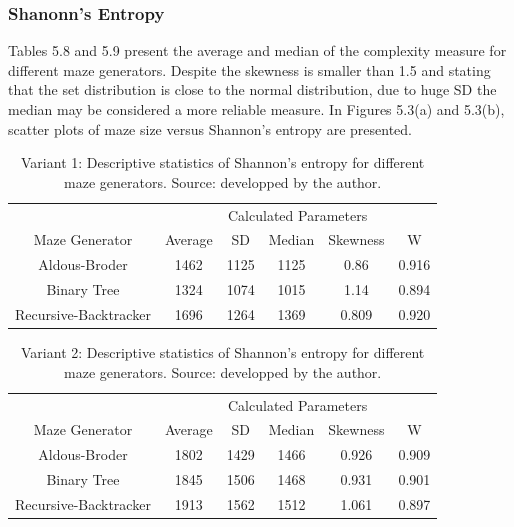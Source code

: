  \subsubsection{Shanonn's Entropy}
Tables 5.8 and 5.9 present the average and median of the complexity measure for different maze generators. Despite the skewness is smaller than 1.5 and stating that the set
distribution is close to the normal distribution, due to huge SD the median may be considered a more reliable measure. In Figures 5.3(a) and 5.3(b), scatter
plots of maze size versus Shannon's entropy are presented.\\

\begin{table}[!ht]
    \centering
    \caption{Variant 1: Descriptive statistics of Shannon's entropy for different maze generators. Source: developped by the author.} 
    \begin{tabular}{c c c c c c}
    \hline
        ~&\multicolumn{5}{c}{Calculated Parameters}\\
        Maze Generator & Average & SD & Median & Skewness & W\\ \hline \hline
        Aldous-Broder & 1462 & 1125 & 1125 & 0.86 & 0.916  \\ 
        Binary Tree & 1324 & 1074 & 1015 & 1.14 & 0.894  \\ 
        Recursive-Backtracker & 1696 & 1264 & 1369 & 0.809 & 0.920 \\ \hline
    \end{tabular}
\end{table}

\begin{table}[!ht]
    \centering
    \caption{Variant 2: Descriptive statistics of Shannon's entropy for different maze generators. Source: developped by the author.} 
    \begin{tabular}{cccccc}
    \hline
        ~&\multicolumn{5}{c}{Calculated Parameters}\\
        Maze Generator & Average & SD & Median & Skewness & W\\ \hline \hline
        Aldous-Broder & 1802 & 1429 & 1466 & 0.926 & 0.909 \\ 
        Binary Tree & 1845 & 1506 & 1468 & 0.931 & 0.901\\ 
        Recursive-Backtracker & 1913 & 1562 & 1512 & 1.061 & 0.897\\ \hline
    \end{tabular}
\end{table}

